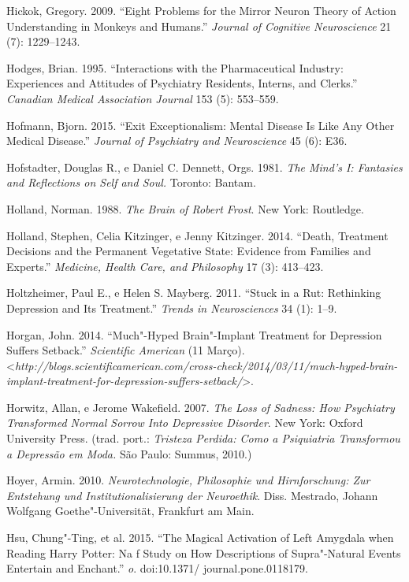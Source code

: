 Hickok, Gregory. 2009. ``Eight Problems for the Mirror Neuron Theory of
Action Understanding in Monkeys and Humans.'' \emph{Journal of Cognitive
Neuroscience} 21 (7): 1229--1243.

Hodges, Brian. 1995. ``Interactions with the Pharmaceutical Industry:
Experiences and Attitudes of Psychiatry Residents, Interns, and
Clerks.'' \emph{Canadian Medical Association Journal} 153 (5): 553--559.

Hofmann, Bjorn. 2015. ``Exit Exceptionalism: Mental Disease Is Like Any
Other Medical Disease.'' \emph{Journal of Psychiatry and Neuroscience}
45 (6): E36.

Hofstadter, Douglas R., e Daniel C. Dennett, Orgs. 1981. \emph{The
Mind's I: Fantasies and Reflections on Self and Soul.} Toronto: Bantam.

Holland, Norman. 1988. \emph{The Brain of Robert Frost}. New York:
Routledge.

Holland, Stephen, Celia Kitzinger, e Jenny Kitzinger. 2014. ``Death,
Treatment Decisions and the Permanent Vegetative State: Evidence from
Families and Experts.'' \emph{Medicine, Health Care, and Philosophy} 17
(3): 413--423.

Holtzheimer, Paul E., e Helen S. Mayberg. 2011. ``Stuck in a Rut:
Rethinking Depression and Its Treatment.'' \emph{Trends in
Neurosciences} 34 (1): 1--9.

Horgan, John. 2014. ``Much"-Hyped Brain"-Implant Treatment for Depression
Suffers Setback.'' \emph{Scientific American} (11 Março).
\textless{}\emph{http://blogs.scientificamerican.com/cross-check/2014/03/11/much-hyped-brain-implant-treatment-for-depression-suffers-setback/}\textgreater{}.

Horwitz, Allan, e Jerome Wakefield. 2007. \emph{The Loss of Sadness: How
Psychiatry Transformed Normal Sorrow Into Depressive Disorder}. New
York: Oxford University Press. (trad. port.: \emph{Tristeza Perdida:
Como a Psiquiatria Transformou a Depressão em Moda.} São Paulo: Summus,
2010.)

Hoyer, Armin. 2010. \emph{Neurotechnologie, Philosophie und
Hirnforschung: Zur Entstehung und Institutionalisierung der Neuroethik}.
Diss. Mestrado, Johann Wolfgang Goethe"-Universität, Frankfurt am Main.

Hsu, Chung"-Ting, et al. 2015. ``The Magical Activation of Left Amygdala
when Reading Harry Potter: Na f Study on How Descriptions of
Supra"-Natural Events Entertain and Enchant.'' \emph{o}.
doi:10.1371/ journal.pone.0118179.


